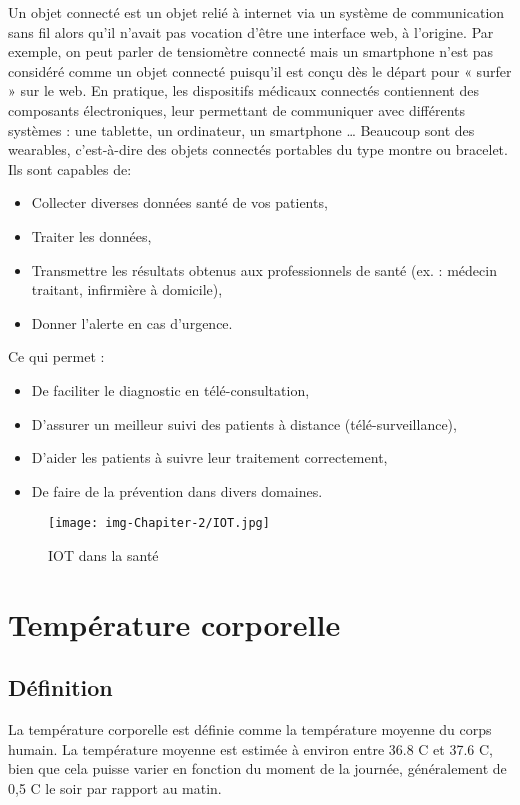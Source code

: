 \documentclass[12pt]{article}
\begin{document}
Un objet connecté est un objet relié à internet via un système de communication sans fil alors qu’il n’avait pas vocation d’être une interface web, à l’origine. Par exemple, on peut parler de tensiomètre connecté mais un smartphone n’est pas considéré comme un objet connecté puisqu’il est conçu dès le départ pour « surfer » sur le web. En pratique, les dispositifs médicaux connectés contiennent des composants électroniques, leur permettant de communiquer avec différents systèmes : une tablette, un ordinateur, un smartphone … Beaucoup sont des wearables, c’est-à-dire des objets connectés portables du type montre ou bracelet.\\
Ils sont capables de:
\begin{itemize}
	\item Collecter diverses données santé de vos patients,
	\item Traiter les données,
	\item Transmettre les résultats obtenus aux professionnels de santé (ex. : médecin traitant, infirmière à domicile),
	\item Donner l’alerte en cas d’urgence.
\end{itemize}
Ce qui permet :
\begin{itemize}
	\item De faciliter le diagnostic en télé-consultation,
	\item D’assurer un meilleur suivi des patients à distance (télé-surveillance),
	\item D’aider les patients à suivre leur traitement correctement,
	\item De faire de la prévention dans divers domaines.
\end{itemize}
\begin{figure}[h]
	\centering
	\texttt{[image: img-Chapiter-2/IOT.jpg]}
	\caption{ IOT dans la santé}
\end{figure}

\section{Température corporelle}
\subsection{Définition}
La température corporelle est définie comme la température moyenne du corps humain. La température moyenne est estimée à environ entre 36.8 C\textdegree{} et 37.6 C\textdegree{}, bien que cela puisse varier en fonction du moment de la journée, généralement de 0,5 C\textdegree{} le soir par rapport au matin.
\end{document}
